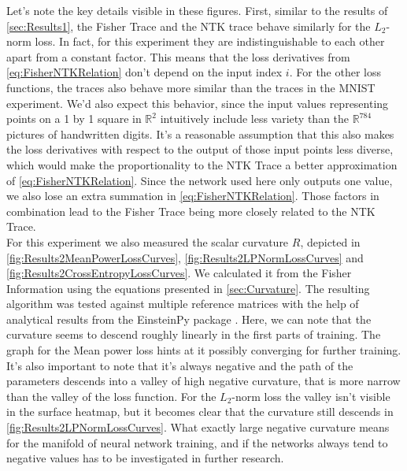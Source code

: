 Let's note the key details visible in these figures. First, similar to the results of \cref{sec:Results1}, the Fisher Trace and the NTK trace behave similarly for the $L_2$-norm loss. In fact, for this experiment they are indistinguishable to each other apart from a constant factor. This means that the loss derivatives from \cref{eq:FisherNTKRelation} don't depend on the input index $i$. For the other loss functions, the traces also behave more similar than the traces in the MNIST experiment. We'd also expect this behavior, since the input values representing points on a 1 by 1 square in $\mathbb{R}^2$ intuitively include less variety than the $\mathbb{R}^{784}$ pictures of handwritten digits. It's a reasonable assumption that this also makes the loss derivatives with respect to the output of those input points less diverse, which would make the proportionality to the NTK Trace a better approximation of \cref{eq:FisherNTKRelation}. Since the network used here only outputs one value, we also lose an extra summation in \cref{eq:FisherNTKRelation}. Those factors in combination lead to the Fisher Trace being more closely related to the NTK Trace.\\
For this experiment we also measured the scalar curvature $R$, depicted in \cref{fig:Results2MeanPowerLossCurves}, \cref{fig:Results2LPNormLossCurves} and \cref{fig:Results2CrossEntropyLossCurves}. We calculated it from the Fisher Information using the equations presented in \cref{sec:Curvature}. The resulting algorithm was tested against multiple reference matrices with the help of analytical results from the EinsteinPy package \cite{EinsteinPyPackage}. Here, we can note that the curvature seems to descend roughly linearly in the first parts of training. The graph for the Mean power loss hints at it possibly converging for further training. It's also important to note that it's always negative and the path of the parameters descends into a valley of high negative curvature, that is more narrow than the valley of the loss function. For the $L_2$-norm loss the valley isn't visible in the surface heatmap, but it becomes clear that the curvature still descends in \cref{fig:Results2LPNormLossCurves}. What exactly large negative curvature means for the manifold of neural network training, and if the networks always tend to negative values has to be investigated in further research.